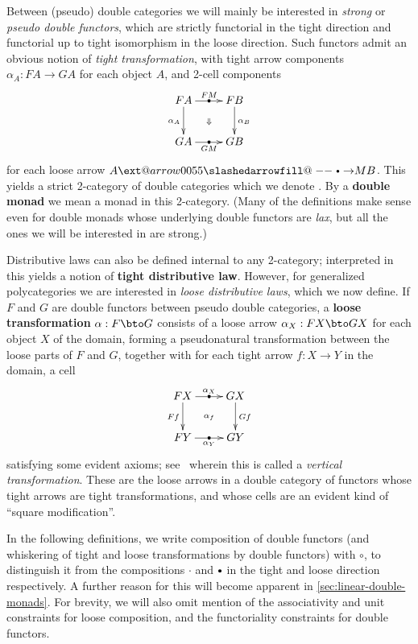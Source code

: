 \documentclass{amsart}
\makeatletter
\def\rightbulletarrowfill@{%
  \slashedarrowfill@\relbar\relbar{\raisebox{1.25pt}{$\scriptscriptstyle\bullet$}}\rightarrow}
\newcommand\xbulletrightarrow[2][]{%
  \ext@arrow 0055{\rightbulletarrowfill@}{#1}{#2}}
\let\xbto\xbulletrightarrow
\let\tc\cdot
\newcommand{\bc}{\mathbin{\raisebox{1pt}{\scriptsize$\bullet$}}}
\let\oc\circ
\makeatother
\begin{document}
Between (pseudo) double categories we will mainly be interested in \emph{strong} or \emph{pseudo double functors}, which are strictly functorial in the tight direction and functorial up to tight isomorphism in the loose direction.
Such functors admit an obvious notion of \emph{tight transformation}, with tight arrow components $\alpha_A:FA\to GA$ for each object $A$, and 2-cell components
\[ \vcenter{\xymatrix{ FA \ar[r]|{\bullet}^{FM} \ar[d]_{\alpha_A} \ar@{}[dr]|{\Downarrow}& FB \ar[d]^{\alpha_B} \\ GA \ar[r]|{\bullet}_{GM} & GB } } \]
for each loose arrow $A\xbto{M} B$.
This yields a strict 2-category of double categories which we denote \cDbl.
By a \textbf{double monad} we mean a monad in this 2-category.
(Many of the definitions make sense even for double monads whose underlying double functors are \emph{lax}, but all the ones we will be interested in are strong.)

Distributive laws can also be defined internal to any 2-category; interpreted in \cDbl this yields a notion of \textbf{tight distributive law}.
However, for generalized polycategories we are interested in \emph{loose distributive laws}, which we now define.
If $F$ and $G$ are double functors between pseudo double categories, a \textbf{loose transformation} $\alpha:F\bto G$ consists of a loose arrow $\alpha_X : F X \bto G X$ for each object $X$ of the domain, forming a pseudonatural transformation between the loose parts of $F$ and $G$, together with for each tight arrow $f:X\to Y$ in the domain, a cell
\[ \xymatrix{ F X \ar[r]|-{\bullet}^-{\alpha_X} \ar[d]_{F f} \ar@{}[dr]|{\alpha_f} & G X \ar[d]^{G f} \\
F Y \ar[r]|-{\bullet}_-{\alpha_Y} & G Y} \]
satisfying some evident axioms; see~\cite{gp:something} wherein this is called a \emph{vertical transformation}.
These are the loose arrows in a double category of functors whose tight arrows are tight transformations, and whose cells are an evident kind of ``square modification''.

In the following definitions, we write composition of double functors (and whiskering of tight and loose transformations by double functors) with $\oc$, to distinguish it from the compositions $\tc$ and $\bc$ in the tight and loose direction respectively.
A further reason for this will become apparent in \cref{sec:linear-double-monads}.
For brevity, we will also omit mention of the associativity and unit constraints for loose composition, and the functoriality constraints for double functors.
\end{document}
